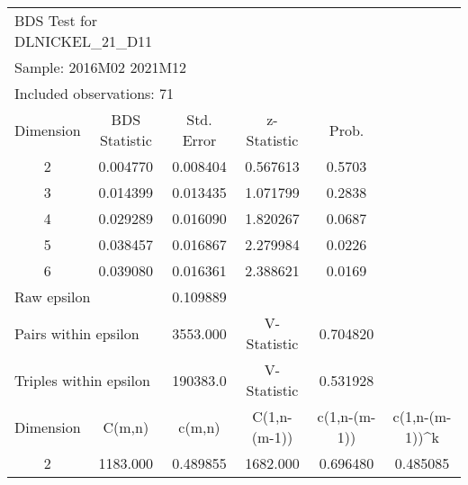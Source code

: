 \begin{tabular}{lrrrrr}
\toprule
\multicolumn{3}{l}{BDS Test for DLNICKEL\_21\_D11}&\multicolumn{1}{c}{}&\multicolumn{1}{c}{}&\multicolumn{1}{c}{}\\
\multicolumn{3}{l}{Sample: 2016M02 2021M12}&\multicolumn{1}{c}{}&\multicolumn{1}{c}{}&\multicolumn{1}{c}{}\\
\multicolumn{3}{l}{Included observations: 71}&\multicolumn{1}{c}{}&\multicolumn{1}{c}{}&\multicolumn{1}{c}{}\\
\midrule
\multicolumn{1}{c}{Dimension}&\multicolumn{1}{c}{BDS Statistic}&\multicolumn{1}{c}{Std. Error}&\multicolumn{1}{c}{z-Statistic}&\multicolumn{1}{c}{Prob.}&\multicolumn{1}{c}{}\\
\multicolumn{1}{c}{2}&\multicolumn{1}{c}{0.004770}&\multicolumn{1}{c}{0.008404}&\multicolumn{1}{c}{0.567613}&\multicolumn{1}{c}{0.5703}&\multicolumn{1}{c}{}\\
\multicolumn{1}{c}{3}&\multicolumn{1}{c}{0.014399}&\multicolumn{1}{c}{0.013435}&\multicolumn{1}{c}{1.071799}&\multicolumn{1}{c}{0.2838}&\multicolumn{1}{c}{}\\
\multicolumn{1}{c}{4}&\multicolumn{1}{c}{0.029289}&\multicolumn{1}{c}{0.016090}&\multicolumn{1}{c}{1.820267}&\multicolumn{1}{c}{0.0687}&\multicolumn{1}{c}{}\\
\multicolumn{1}{c}{5}&\multicolumn{1}{c}{0.038457}&\multicolumn{1}{c}{0.016867}&\multicolumn{1}{c}{2.279984}&\multicolumn{1}{c}{0.0226}&\multicolumn{1}{c}{}\\
\multicolumn{1}{c}{6}&\multicolumn{1}{c}{0.039080}&\multicolumn{1}{c}{0.016361}&\multicolumn{1}{c}{2.388621}&\multicolumn{1}{c}{0.0169}&\multicolumn{1}{c}{}\\
\midrule
\multicolumn{2}{l}{Raw epsilon}&\multicolumn{1}{c}{0.109889}&\multicolumn{1}{c}{}&\multicolumn{1}{c}{}&\multicolumn{1}{c}{}\\
\multicolumn{2}{l}{Pairs within epsilon}&\multicolumn{1}{c}{3553.000}&\multicolumn{1}{c}{V-Statistic}&\multicolumn{1}{c}{0.704820}&\multicolumn{1}{c}{}\\
\multicolumn{2}{l}{Triples within epsilon}&\multicolumn{1}{c}{190383.0}&\multicolumn{1}{c}{V-Statistic}&\multicolumn{1}{c}{0.531928}&\multicolumn{1}{c}{}\\
\midrule
\multicolumn{1}{c}{Dimension}&\multicolumn{1}{c}{C(m,n)}&\multicolumn{1}{c}{c(m,n)}&\multicolumn{1}{c}{C(1,n-(m-1))}&\multicolumn{1}{c}{c(1,n-(m-1))}&\multicolumn{1}{c}{c(1,n-(m-1))\textasciicircum k}\\
\multicolumn{1}{c}{2}&\multicolumn{1}{c}{1183.000}&\multicolumn{1}{c}{0.489855}&\multicolumn{1}{c}{1682.000}&\multicolumn{1}{c}{0.696480}&\multicolumn{1}{c}{0.485085}\\

\end{tabular}
